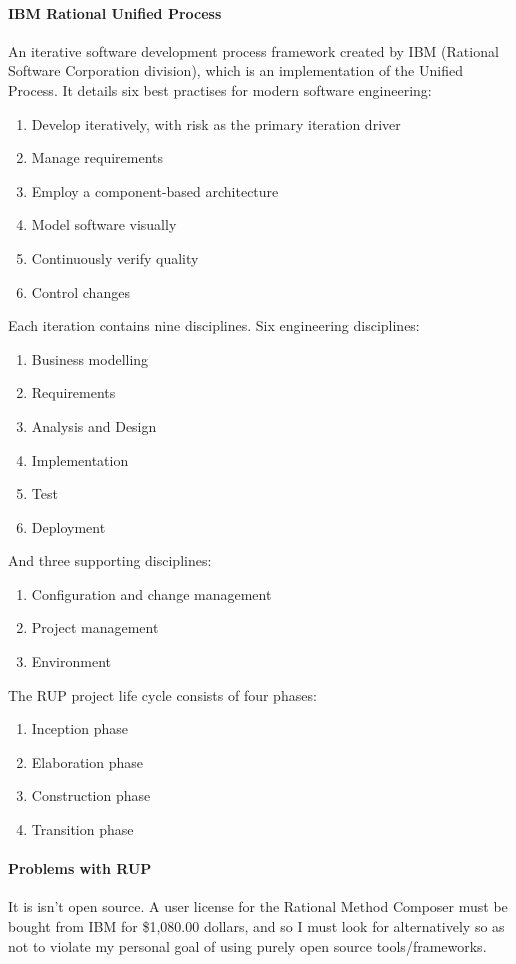 \paragraph{IBM Rational Unified Process} An iterative software development
process framework created by IBM (Rational Software Corporation division), which
is an implementation of the Unified Process. It details six best practises for
modern software engineering:

\begin{enumerate}
\item Develop iteratively, with risk as the primary iteration driver
\item Manage requirements
\item Employ a component-based architecture
\item Model software visually
\item Continuously verify quality
\item Control changes
\end{enumerate}

\noindent
Each iteration contains nine disciplines. Six engineering disciplines:
\begin{enumerate}
\item Business modelling
\item Requirements
\item Analysis and Design
\item Implementation
\item Test
\item Deployment
\end{enumerate}

\noindent
And three supporting disciplines:
\begin{enumerate}
\item Configuration and change management
\item Project management
\item Environment
\end{enumerate}

\noindent
The RUP project life cycle consists of four phases:
\begin{enumerate}
\item Inception phase
\item Elaboration phase
\item Construction phase
\item Transition phase
\end{enumerate}

\paragraph{Problems with RUP} It is isn't open source. A user license for the
Rational Method Composer must be bought from IBM for \$1,080.00 dollars, and so
I must look for alternatively so as not to violate my personal goal of using
purely open source tools/frameworks.

